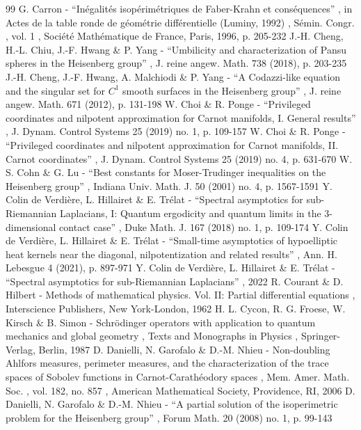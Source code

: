 \documentclass[11pt]{article}
\theoremstyle{definition}
\newcommand{\1}{\mathbbm{1}}
\numberwithin{equation}{section}
\begin{document}
\begin{thebibliography}{99}
 G. Carron - “Inégalités isopérimétriques de Faber-Krahn et conséquences” , in Actes de la table ronde de géométrie différentielle (Luminy, 1992) , Sémin. Congr. , vol. 1 , Société Mathématique de France, Paris, 1996, p. 205-232
 J.-H. Cheng, H.-L. Chiu, J.-F. Hwang \& P. Yang - “Umbilicity and characterization of Pansu spheres in the Heisenberg group” , J. reine angew. Math. 738 (2018), p. 203-235
 J.-H. Cheng, J.-F. Hwang, A. Malchiodi \& P. Yang - “A Codazzi-like equation and the singular set for $C^1$ smooth surfaces in the Heisenberg group” , J. reine angew. Math. 671 (2012), p. 131-198
 W. Choi \& R. Ponge - “Privileged coordinates and nilpotent approximation for Carnot manifolds, I. General results” , J. Dynam. Control Systems 25 (2019) no. 1, p. 109-157
 W. Choi \& R. Ponge - “Privileged coordinates and nilpotent approximation for Carnot manifolds, II. Carnot coordinates” , J. Dynam. Control Systems 25 (2019) no. 4, p. 631-670
 W. S. Cohn \& G. Lu - “Best constants for Moser-Trudinger inequalities on the Heisenberg group” , Indiana Univ. Math. J. 50 (2001) no. 4, p. 1567-1591
 Y. Colin de Verdière, L. Hillairet \& E. Trélat - “Spectral asymptotics for sub-Riemannian Laplacians, I: Quantum ergodicity and quantum limits in the 3-dimensional contact case” , Duke Math. J. 167 (2018) no. 1, p. 109-174
 Y. Colin de Verdière, L. Hillairet \& E. Trélat - “Small-time asymptotics of hypoelliptic heat kernels near the diagonal, nilpotentization and related results” , Ann. H. Lebesgue 4 (2021), p. 897-971
 Y. Colin de Verdière, L. Hillairet \& E. Trélat - “Spectral asymptotics for sub-Riemannian Laplacians” , 2022
 R. Courant \& D. Hilbert - Methods of mathematical physics. Vol. II: Partial differential equations , Interscience Publishers, New York-London, 1962
 H. L. Cycon, R. G. Froese, W. Kirsch \& B. Simon - Schrödinger operators with application to quantum mechanics and global geometry , Texts and Monographs in Physics , Springer-Verlag, Berlin, 1987
 D. Danielli, N. Garofalo \& D.-M. Nhieu - Non-doubling Ahlfors measures, perimeter measures, and the characterization of the trace spaces of Sobolev functions in Carnot-Carathéodory spaces , Mem. Amer. Math. Soc. , vol. 182, no. 857 , American Mathematical Society, Providence, RI, 2006
 D. Danielli, N. Garofalo \& D.-M. Nhieu - “A partial solution of the isoperimetric problem for the Heisenberg group” , Forum Math. 20 (2008) no. 1, p. 99-143

\end{thebibliography}
\end{document}
